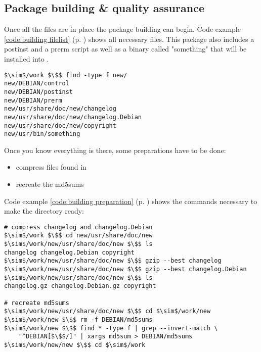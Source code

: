 \subsection{Package building \& quality assurance}\label{subsection:package %
building} Once all the files are in place the package building can begin. Code
example \ref{code:building filelist} (p. \pageref{code:building filelist}) shows
all necessary files.  This package also includes a postinst and a prerm script
as well as a binary called "something" that will be installed into
.
\begin{lstlisting}[label=code:building filelist,caption=A directory ready
to be made into a .deb package, float=ht]
$\sim$/work $\$$ find -type f new/
new/DEBIAN/control
new/DEBIAN/postinst
new/DEBIAN/prerm
new/usr/share/doc/new/changelog
new/usr/share/doc/new/changelog.Debian
new/usr/share/doc/new/copyright
new/usr/bin/something
\end{lstlisting}

Once you know everything is there, some preparations have to be done:
\begin{itemize}
  \item compress files found in 
  \item recreate the md5sums
\end{itemize}
Code example \ref{code:building preparation} (p. \pageref{code:building
preparation}) shows the commands necessary to make the directory ready:
\begin{lstlisting}[label=code:building preparation,caption=preparing a directory for
package creation, float=ht]
# compress changelog and changelog.Debian
$\sim$/work $\$$ cd new/usr/share/doc/new
$\sim$/work/new/usr/share/doc/new $\$$ ls
changelog changelog.Debian copyright
$\sim$/work/new/usr/share/doc/new $\$$ gzip --best changelog
$\sim$/work/new/usr/share/doc/new $\$$ gzip --best changelog.Debian
$\sim$/work/new/usr/share/doc/new $\$$ ls
changelog.gz changelog.Debian.gz copyright

# recreate md5sums
$\sim$/work/new/usr/share/doc/new $\$$ cd $\sim$/work/new
$\sim$/work/new $\$$ rm -f DEBIAN/md5sums
$\sim$/work/new $\$$ find * -type f | grep --invert-match \ 
	"^DEBIAN[$\$$/]" | xargs md5sum > DEBIAN/md5sums
$\sim$/work/new/new $\$$ cd $\sim$/work
\end{lstlisting}

